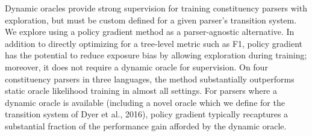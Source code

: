 Dynamic oracles provide strong supervision for training constituency parsers with exploration, but must be custom defined for a given parser's transition system. We explore using a policy gradient method as a parser-agnostic alternative. In addition to directly optimizing for a tree-level metric such as F1, policy gradient has the potential to reduce exposure bias by allowing exploration during training; moreover, it does not require a dynamic oracle for supervision. On four constituency parsers in three languages, the method substantially outperforms static oracle likelihood training in almost all settings. For parsers where a dynamic oracle is available (including a novel oracle which we define for the transition system of Dyer et al., 2016), policy gradient typically recaptures a substantial fraction of the performance gain afforded by the dynamic oracle.
